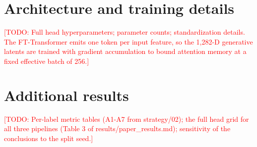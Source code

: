 \documentclass{article}
\newcommand{\todo}[1]{\textcolor{red}{[TODO: #1]}}
\begin{document}
\appendix

\section{Architecture and training details}
\todo{Full head hyperparameters; parameter counts; standardization details.
The FT-Transformer emits one token per input feature, so the 1{,}282-D
generative latents are trained with gradient accumulation to bound attention
memory at a fixed effective batch of 256.}

\section{Additional results}
\todo{Per-label metric tables (A1-A7 from strategy/02); the full head grid for
all three pipelines (Table 3 of results/paper\_results.md); sensitivity of the
conclusions to the split seed.}
\end{document}

